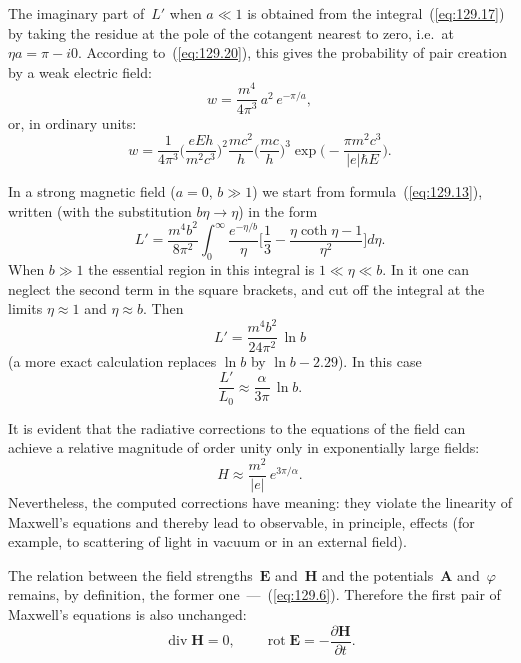 
The imaginary part of~$L'$ when $a\ll 1$ is obtained from the integral~(\ref{eq:129.17}) by taking the residue at the pole of the cotangent nearest to zero, i.e.\ at $\eta a = \pi - i0$. According to~(\ref{eq:129.20}), this gives the probability of pair creation by a weak electric field:
\[
w = \frac{m^4}{4\pi^3}\,a^2\,e^{-\pi/a},
\]
or, in ordinary units:
\begin{equation}
w = \frac{1}{4\pi^3}\biggl(\frac{eEh}{m^2c^3}\biggr)^{\!2}\frac{mc^2}{h}\biggl(\frac{mc}{h}\biggr)^{\!3}\exp\biggl(-\frac{\pi m^2c^3}{|e|\hbar E}\biggr).
\label{eq:129.22}
\end{equation}

In a strong magnetic field ($a = 0$, $b\gg 1$) we start from formula~(\ref{eq:129.13}), written (with the substitution $b\eta \to \eta$) in the form
\[
L' = \frac{m^4 b^2}{8\pi^2}\int_0^{\infty}\frac{e^{-\eta/b}}{\eta}\biggl[\frac{1}{3} - \frac{\eta\coth\eta - 1}{\eta^2}\biggr]d\eta.
\]
When $b\gg 1$ the essential region in this integral is $1\ll\eta\ll b$. In it one can neglect the second term in the square brackets, and cut off the integral at the limits $\eta \approx 1$ and $\eta \approx b$. Then
\begin{equation}
L' = \frac{m^4 b^2}{24\pi^2}\,\ln b
\label{eq:129.23}
\end{equation}
(a more exact calculation replaces $\ln b$ by $\ln b - 2{.}29$). In this case
\[
\frac{L'}{L_0} \approx \frac{\alpha}{3\pi}\,\ln b.
\]


It is evident that the radiative corrections to the equations of the field can achieve a relative magnitude of order unity only in exponentially large fields:
\begin{equation}
H \approx \frac{m^2}{|e|}\,e^{3\pi/\alpha}.
\label{eq:129.24}
\end{equation}
Nevertheless, the computed corrections have meaning: they violate the linearity of Maxwell's equations and thereby lead to observable, in principle, effects (for example, to scattering of light in vacuum or in an external field).

The relation between the field strengths~$\mathbf{E}$ and~$\mathbf{H}$ and the potentials~$\mathbf{A}$ and~$\varphi$ remains, by definition, the former one~---~(\ref{eq:129.6}). Therefore the first pair of Maxwell's equations is also unchanged:
\begin{equation}
\operatorname{div}\mathbf{H} = 0,\qquad \operatorname{rot}\mathbf{E} = -\frac{\partial\mathbf{H}}{\partial t}.
\label{eq:129.25}
\end{equation}

